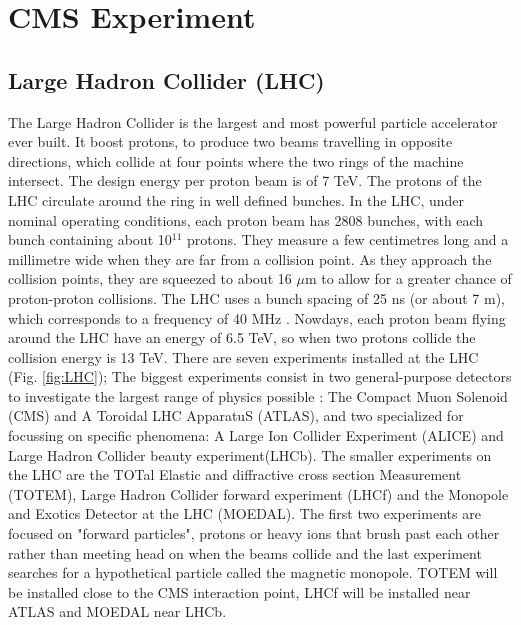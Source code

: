 \chapter{CMS Experiment}

\section{Large Hadron Collider (LHC)}

The Large Hadron Collider is the largest and most powerful particle accelerator ever built. It boost protons, to produce two beams travelling in opposite directions, which collide at four points where the two rings of the machine intersect. The design energy per proton beam is of 7 TeV. The protons of the LHC circulate around the ring in well defined bunches. In the LHC, under nominal operating conditions, each proton beam has 2808 bunches, with each bunch containing about 10$^{11}$ protons. They measure a few centimetres long and a millimetre wide when they are far from a collision point. As they approach the collision points, they are squeezed to about 16 $\mu$m to allow for a greater chance of proton-proton collisions. The LHC uses a bunch spacing of 25 ns (or about 7 m), which  corresponds to a frequency of 40 MHz \cite{Bruning:2004ej}. Nowdays, each proton beam flying around the LHC have an energy of 6.5 TeV, so when two protons collide the collision energy is 13 TeV. There are seven experiments installed at the LHC (Fig. \ref{fig:LHC}); The biggest experiments consist in two general-purpose detectors to investigate the largest range of physics possible : The Compact Muon Solenoid (CMS) and A Toroidal LHC ApparatuS (ATLAS), and two specialized for focussing on specific phenomena: A Large Ion Collider Experiment (ALICE) and Large Hadron Collider beauty experiment(LHCb). The smaller experiments on the LHC are the TOTal Elastic and diffractive cross section Measurement (TOTEM), Large Hadron Collider forward experiment (LHCf) and the Monopole and Exotics Detector at the LHC (MOEDAL). The first two experiments are  focused on "forward particles", protons or heavy ions that brush past each other rather than meeting head on when the beams collide and the last experiment searches for a hypothetical particle called the magnetic monopole. TOTEM will be installed close to the CMS interaction point, LHCf will be installed near ATLAS and MOEDAL near LHCb. 

